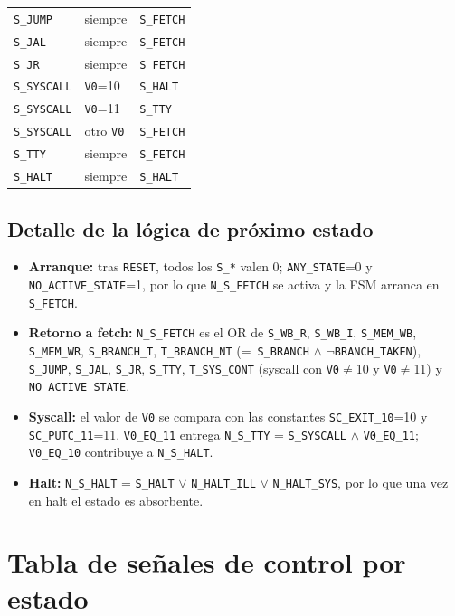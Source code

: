 \documentclass[11pt,a4paper]{article}
\begin{document}
\begin{longtable}{@{}p{2.7cm}p{4.2cm}p{8.5cm}@{}}
\texttt{S\_JUMP} & siempre & \texttt{S\_FETCH} \\
\texttt{S\_JAL} & siempre & \texttt{S\_FETCH} \\
\texttt{S\_JR} & siempre & \texttt{S\_FETCH} \\
\texttt{S\_SYSCALL} & \texttt{V0}=10 & \texttt{S\_HALT} \\
\texttt{S\_SYSCALL} & \texttt{V0}=11 & \texttt{S\_TTY} \\
\texttt{S\_SYSCALL} & otro \texttt{V0} & \texttt{S\_FETCH} \\
\texttt{S\_TTY} & siempre & \texttt{S\_FETCH} \\
\texttt{S\_HALT} & siempre & \texttt{S\_HALT} \\
\bottomrule
\end{longtable}

\subsection{Detalle de la lógica de próximo estado}

\begin{itemize}
  \item \textbf{Arranque:} tras \texttt{RESET}, todos los \texttt{S\_*} valen 0; \texttt{ANY\_STATE}=0 y \texttt{NO\_ACTIVE\_STATE}=1, por lo que \texttt{N\_S\_FETCH} se activa y la FSM arranca en \texttt{S\_FETCH}.
  \item \textbf{Retorno a fetch:} \texttt{N\_S\_FETCH} es el OR de \texttt{S\_WB\_R}, \texttt{S\_WB\_I}, \texttt{S\_MEM\_WB}, \texttt{S\_MEM\_WR}, \texttt{S\_BRANCH\_T}, \texttt{T\_BRANCH\_NT} (=\ \texttt{S\_BRANCH} $\land$ $\neg$\texttt{BRANCH\_TAKEN}), \texttt{S\_JUMP}, \texttt{S\_JAL}, \texttt{S\_JR}, \texttt{S\_TTY}, \texttt{T\_SYS\_CONT} (syscall con \texttt{V0}$\neq$10 y \texttt{V0}$\neq$11) y \texttt{NO\_ACTIVE\_STATE}.
  \item \textbf{Syscall:} el valor de \texttt{V0} se compara con las constantes \texttt{SC\_EXIT\_10}=10 y \texttt{SC\_PUTC\_11}=11. \texttt{V0\_EQ\_11} entrega \texttt{N\_S\_TTY} = \texttt{S\_SYSCALL} $\land$ \texttt{V0\_EQ\_11}; \texttt{V0\_EQ\_10} contribuye a \texttt{N\_S\_HALT}.
  \item \textbf{Halt:} \texttt{N\_S\_HALT} = \texttt{S\_HALT} $\lor$ \texttt{N\_HALT\_ILL} $\lor$ \texttt{N\_HALT\_SYS}, por lo que una vez en halt el estado es absorbente.
\end{itemize}

\section{Tabla de señales de control por estado}
\end{document}
